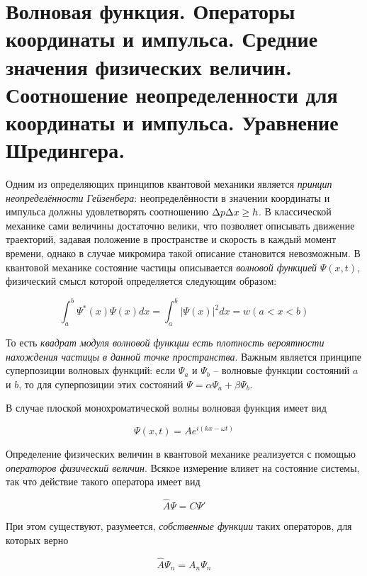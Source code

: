 \section{Волновая функция. Операторы координаты и импульса. Средние значения физических величин.
Соотношение неопределенности для координаты и импульса. Уравнение Шредингера.}

Одним из определяющих принципов квантовой механики является \textit{принцип неопределённости Гейзенбера}: неопределённости в значении координаты и импульса должны удовлетворять соотношению $\Delta p \Delta x \geq \hbar$. В классической механике сами величины достаточно велики, что позволяет описывать движение траекторий, задавая положение в пространстве и скорость в каждый момент времени, однако в случае микромира такой описание становится невозможным. В квантовой механике состояние частицы описывается \textit{волновой функцией} $\Psi (x, t)$, физический смысл которой определяется следующим образом:

\begin{equation}
    \int_a^b \Psi^* (x) \Psi (x) d x = \int_a^b \left| \Psi (x) \right|^2 d x = w (a < x < b)
\end{equation}

\noindent
То есть \textit{квадрат модуля волновой функции есть плотность вероятности нахождения частицы в данной точке пространства}. Важным является принципе суперпозиции волновых функций: если $\Psi_a$ и $\Psi_b$ -- волновые функции состояний $a$ и $b$, то для суперпозиции этих состояний $\Psi = \alpha \Psi_a + \beta \Psi_b$.

В случае плоской монохроматической волны волновая функция имеет вид

\begin{equation}
    \Psi (x, t) = A e^{i \left( k x - \omega t \right)}
\end{equation}

Определение физических величин в квантовой механике реализуется с помощью \textit{операторов физический величин}. Всякое измерение влияет на состояние системы, так что действие такого оператора имеет вид

\begin{equation}
    \hat{A} \Psi = C \Psi'
\end{equation}

\noindent
При этом существуют, разумеется, \textit{собственные функции} таких операторов, для которых верно

\begin{equation}
    \hat{A} \Psi_n = A_n \Psi_n
\end{equation}


